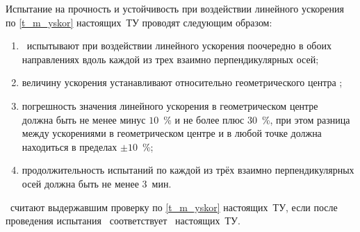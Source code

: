 Испытание на прочность и устойчивость при воздействии линейного ускорения по \ref{t_m_yskor} настоящих~ТУ проводят следующим образом:
%
\begin{enumerate}
	\item \dut \ испытывают при воздействии линейного ускорения поочередно в обоих направлениях вдоль каждой из трех взаимно перпендикулярных осей;
	\item величину  ускорения  устанавливают относительно геометрического центра \dut;
	\item погрешность значения линейного ускорения в геометрическом центре \\ должна быть не менее минус $10$~\% и не более плюс $30$~\%, при этом разница между ускорениями в геометрическом центре и в любой точке должна находиться в пределах $\pm 10$~\%; 
	\item продолжительность испытаний по каждой из трёх взаимно перпендикулярных осей должна быть не менее $3$~мин.
\end{enumerate}

\dut \ считают выдержавшим проверку по \ref{t_m_yskor} настоящих~ТУ, если после проведения испытания \treb \ соответствует \trebafter \ настоящих~ТУ.
